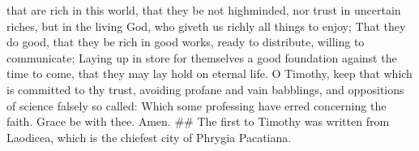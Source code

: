 that are rich in this world, that they be not highminded, nor trust in
uncertain riches, but in the living God, who giveth us richly all things
to enjoy;  That they do good, that they be rich in good
works, ready to distribute, willing to communicate; 
Laying up in store for themselves a good foundation against the time to
come, that they may lay hold on eternal life.  O Timothy,
keep that which is committed to thy trust, avoiding profane and vain
babblings, and oppositions of science falsely so called: 
Which some professing have erred concerning the faith. Grace be with
thee. Amen. \#\# The first to Timothy was written from Laodicea, which
is the chiefest city of Phrygia Pacatiana.
